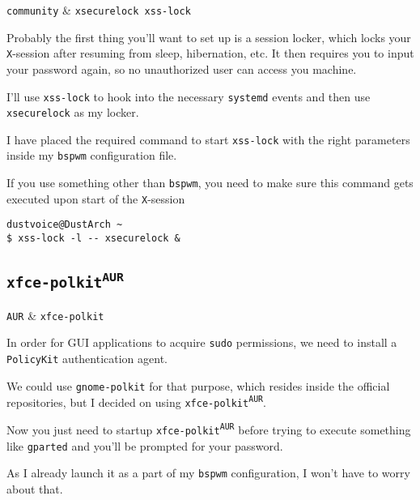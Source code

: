 \documentclass[10pt]{dustdoc}
\begin{document}
\begin{packagetable}
    \texttt{community} & \texttt{xsecurelock xss-lock} \\ 
\end{packagetable}

Probably the first thing you’ll want to set up is a session locker, which locks your \texttt{X}-session after resuming from sleep, hibernation, etc.
It then requires you to input your password again, so no unauthorized user can access you machine.

I’ll use \texttt{xss-lock} to hook into the necessary \texttt{systemd} events and then use \texttt{xsecurelock} as my locker.

\begin{NOTE}
    I have placed the required command to start \texttt{xss-lock} with the right parameters inside my \texttt{bspwm} configuration file.

    If you use something other than \texttt{bspwm}, you need to make sure this command gets executed upon start of the \texttt{X}-session

    \begin{verbatim}
dustvoice@DustArch ~
$ xss-lock -l -- xsecurelock &
    \end{verbatim}
\end{NOTE}

\subsection{\texttt{xfce-polkit\texorpdfstring{\textsuperscript{AUR}}{ (AUR)}}}
\label{sec:xfce-polkit-aur}

\begin{packagetable}
    \texttt{AUR} & \texttt{xfce-polkit} \\ 
\end{packagetable}

In order for GUI applications to acquire \texttt{sudo} permissions, we need to install a \texttt{PolicyKit} authentication agent.

We could use \texttt{gnome-polkit} for that purpose, which resides inside the official repositories, but I decided on using \texttt{xfce-polkit\textsuperscript{\texttt{AUR}}}.

Now you just need to startup \texttt{xfce-polkit\textsuperscript{\texttt{AUR}}} before trying to execute something like \texttt{gparted} and you’ll be prompted for your password.

As I already launch it as a part of my \texttt{bspwm} configuration, I won’t have to worry about that.
\end{document}
